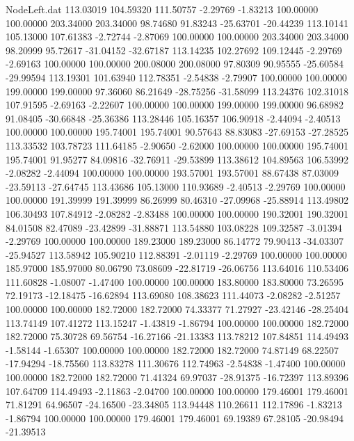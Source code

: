 \begin{filecontents}{NodeLeft.dat}
 113.03019  104.59320  111.50757    -2.29769   -1.83213  100.00000  100.00000  203.34000  203.34000   98.74680   91.83243  -25.63701  -20.44239
 113.10141  105.13000  107.61383    -2.72744   -2.87069  100.00000  100.00000  203.34000  203.34000   98.20999   95.72617  -31.04152  -32.67187
 113.14235  102.27692  109.12445    -2.29769   -2.69163  100.00000  100.00000  200.08000  200.08000   97.80309   90.95555  -25.60584  -29.99594
 113.19301  101.63940  112.78351    -2.54838   -2.79907  100.00000  100.00000  199.00000  199.00000   97.36060   86.21649  -28.75256  -31.58099
 113.24376  102.31018  107.91595    -2.69163   -2.22607  100.00000  100.00000  199.00000  199.00000   96.68982   91.08405  -30.66848  -25.36386
 113.28446  105.16357  106.90918    -2.44094   -2.40513  100.00000  100.00000  195.74001  195.74001   90.57643   88.83083  -27.69153  -27.28525
 113.33532  103.78723  111.64185    -2.90650   -2.62000  100.00000  100.00000  195.74001  195.74001   91.95277   84.09816  -32.76911  -29.53899
 113.38612  104.89563  106.53992    -2.08282   -2.44094  100.00000  100.00000  193.57001  193.57001   88.67438   87.03009  -23.59113  -27.64745
 113.43686  105.13000  110.93689    -2.40513   -2.29769  100.00000  100.00000  191.39999  191.39999   86.26999   80.46310  -27.09968  -25.88914
 113.49802  106.30493  107.84912    -2.08282   -2.83488  100.00000  100.00000  190.32001  190.32001   84.01508   82.47089  -23.42899  -31.88871
 113.54880  103.08228  109.32587    -3.01394   -2.29769  100.00000  100.00000  189.23000  189.23000   86.14772   79.90413  -34.03307  -25.94527
 113.58942  105.90210  112.88391    -2.01119   -2.29769  100.00000  100.00000  185.97000  185.97000   80.06790   73.08609  -22.81719  -26.06756
 113.64016  110.53406  111.60828    -1.08007   -1.47400  100.00000  100.00000  183.80000  183.80000   73.26595   72.19173  -12.18475  -16.62894
 113.69080  108.38623  111.44073    -2.08282   -2.51257  100.00000  100.00000  182.72000  182.72000   74.33377   71.27927  -23.42146  -28.25404
 113.74149  107.41272  113.15247    -1.43819   -1.86794  100.00000  100.00000  182.72000  182.72000   75.30728   69.56754  -16.27166  -21.13383
 113.78212  107.84851  114.49493    -1.58144   -1.65307  100.00000  100.00000  182.72000  182.72000   74.87149   68.22507  -17.94294  -18.75560
 113.83278  111.30676  112.74963    -2.54838   -1.47400  100.00000  100.00000  182.72000  182.72000   71.41324   69.97037  -28.91375  -16.72397
 113.89396  107.64709  114.49493    -2.11863   -2.04700  100.00000  100.00000  179.46001  179.46001   71.81291   64.96507  -24.16500  -23.34805
 113.94448  110.26611  112.17896    -1.83213   -1.86794  100.00000  100.00000  179.46001  179.46001   69.19389   67.28105  -20.98494  -21.39513

\end{filecontents}
